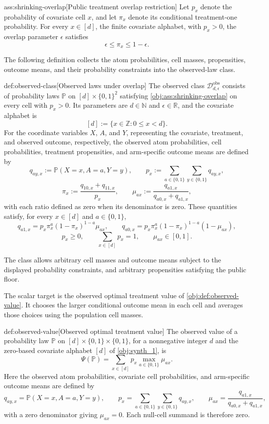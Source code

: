 \documentclass[11pt]{article}
\begin{document}
\begin{assumptionv}{ass:shrinking-overlap}[Public treatment overlap restriction]
Let \(p_x\) denote the probability of covariate cell \(x\), and let \(\pi_x\) denote its conditional treatment-one probability. For every \(x\in[d]\), the finite covariate alphabet, with \(p_x>0\), the overlap parameter \(\epsilon\) satisfies
\[
\epsilon\le\pi_x\le1-\epsilon.
\]
\end{assumptionv}

The following definition collects the atom probabilities, cell masses, propensities, outcome means, and their probability constraints into the observed-law class.

\begin{definitionv}{def:observed-class}[Observed laws under overlap]
The observed class \(\mathcal D_{d,\epsilon}^{\mathrm{obs}}\) consists of probability laws \(\mathbb P\) on \([d]\times\{0,1\}^2\) satisfying \cref{obj:ass:shrinking-overlap} on every cell with \(p_x>0\). Its parameters are \(d\in\mathbb N\) and \(\epsilon\in\mathbb R\), and the covariate alphabet is
\[
[d]:=\{x\in\mathbb Z:0\le x<d\}.
\]
For the coordinate variables \(X\), \(A\), and \(Y\), representing the covariate, treatment, and observed outcome, respectively, the observed atom probabilities, cell probabilities, treatment propensities, and arm-specific outcome means are defined by
\[
q_{ay,x}:=\mathbb P(X=x,A=a,Y=y),
\qquad
p_x:=\sum_{a\in\{0,1\}}\sum_{y\in\{0,1\}}q_{ay,x},
\]
\[
\pi_x:=\frac{q_{10,x}+q_{11,x}}{p_x},
\qquad
\mu_{ax}:=\frac{q_{a1,x}}{q_{a0,x}+q_{a1,x}},
\]
with each ratio defined as zero when its denominator is zero. These quantities satisfy, for every \(x\in[d]\) and \(a\in\{0,1\}\),
\[
q_{a1,x}=p_x\pi_x^a(1-\pi_x)^{1-a}\mu_{ax},
\qquad
q_{a0,x}=p_x\pi_x^a(1-\pi_x)^{1-a}(1-\mu_{ax}),
\]
\[
p_x\ge0,
\qquad
\sum_{x\in[d]}p_x=1,
\qquad
\mu_{ax}\in[0,1].
\]
\end{definitionv}

The class allows arbitrary cell masses and outcome means subject to the displayed probability constraints, and arbitrary propensities satisfying the public floor.

The scalar target is the observed optimal treatment value  of \cref{obj:def:observed-value}. It chooses the larger conditional outcome mean in each cell and averages those choices using the population cell masses.

\begin{definitionv}{def:observed-value}[Observed optimal treatment value]
The observed value of a probability law \(\mathbb P\) on \([d]\times\{0,1\}\times\{0,1\}\), for a nonnegative integer \(d\) and the zero-based covariate alphabet \([d]\) of \cref{obj:synth_1}, is
\[
\Psi(\mathbb P)
=\sum_{x\in[d]}p_x\max_{a\in\{0,1\}}\mu_{ax}.
\]
Here the observed atom probabilities, covariate cell probabilities, and arm-specific outcome means are defined by
\[
q_{ay,x}=\mathbb P(X=x,A=a,Y=y),
\qquad
p_x=\sum_{a\in\{0,1\}}\sum_{y\in\{0,1\}}q_{ay,x},
\qquad
\mu_{ax}=\frac{q_{a1,x}}{q_{a0,x}+q_{a1,x}},
\]
with a zero denominator giving \(\mu_{ax}=0\). Each null-cell summand is therefore zero.
\end{definitionv}
\end{document}
